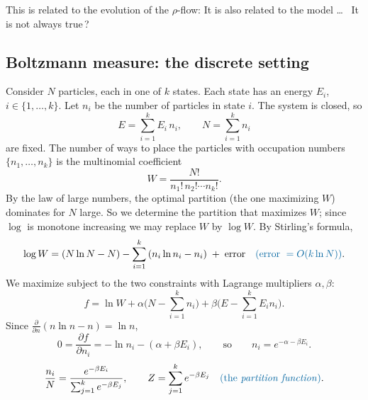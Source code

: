 This is related to the evolution of the $\rho$-flow:  It is also related to the model \ldots\  It is not always true\,? 

\subsection{Boltzmann measure: the discrete setting}
\label{L11:sec:boltzmann}

Consider $N$ particles, each in one of $k$ states. Each state has an energy $E_i$, $i\in\{1,\dots,k\}$. Let $n_i$ be the number of particles in state $i$. The system is closed, so
\[
E=\sum_{i=1}^k E_i\,n_i,\qquad N=\sum_{i=1}^k n_i
\]
are fixed. The number of ways to place the particles with occupation numbers $\{n_1,\dots,n_k\}$ is the multinomial coefficient
\[
W=\frac{N!}{n_1!\,n_2!\cdots n_k!}.
\]
By the law of large numbers, the optimal partition (the one maximizing $W$) dominates for $N$ large.
So we determine the partition that maximizes $W$; since $\log$ is monotone increasing we may replace $W$ by $\log W$. By Stirling's formula,
\[
\log W=(N\ln N-N)-\sum_{i=1}^k\,(n_i\ln n_i-n_i)\;+\;\text{error}\quad\added{(\text{error }=O(k\ln N))}.
\]
We maximize subject to the two constraints with Lagrange multipliers $\alpha,\beta$:
\[
f=\ln W+\alpha\Big(N-\sum_{i=1}^k n_i\Big)+\beta\Big(E-\sum_{i=1}^k E_i n_i\Big).
\]
Since $\frac{\partial}{\partial n}(n\ln n-n)=\ln n$,
\[
0=\frac{\partial f}{\partial n_i}=-\ln n_i-(\alpha+\beta E_i),
\qquad\text{so}\qquad n_i=e^{-\alpha-\beta E_i}.
\]
\[
\frac{n_i}{N}=\frac{e^{-\beta E_i}}{\sum_{j=1}^k e^{-\beta E_j}},\qquad
Z=\sum_{j=1}^k e^{-\beta E_j}\quad\added{\text{(the \emph{partition function})}}.
\]

